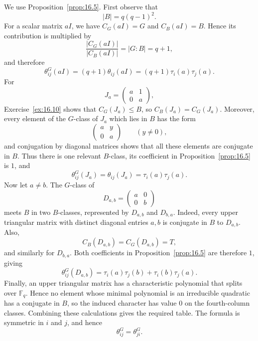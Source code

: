 \documentclass[../Odyssey_Project.tex]{subfiles}
\begin{document}
\begin{solution}
    We use Proposition~\ref{prop:16.5}. First observe that
    \[
        |B|=q(q-1)^2.
    \]
    For a scalar matrix $aI$, we have $C_G(aI)=G$ and $C_B(aI)=B$. Hence its contribution is multiplied by
    \[
        \frac{|C_G(aI)|}{|C_B(aI)|}=|G : B|=q+1,
    \]
    and therefore
    \[
        \theta_{ij}^G(aI)
        =
        (q+1)\theta_{ij}(aI)
        =
        (q+1)\tau_i(a)\tau_j(a).
    \]
    For
    \[
        J_a=
        \begin{pmatrix}
            a&1\\
            0&a
        \end{pmatrix},
    \]
    Exercise~\ref{ex:16.10} shows that $C_G(J_a)\leq B$, so $C_B(J_a)=C_G(J_a)$. Moreover, every element of the $G$-class of $J_a$ which lies in $B$ has the form
    \[
        \begin{pmatrix}
            a&y\\
            0&a
        \end{pmatrix}
        \qquad(y\neq0),
    \]
    and conjugation by diagonal matrices shows that all these elements are conjugate in $B$. Thus there is one relevant $B$-class, its coefficient in Proposition~\ref{prop:16.5} is $1$, and
    \[
        \theta_{ij}^G(J_a)
        =
        \theta_{ij}(J_a)
        =
        \tau_i(a)\tau_j(a).
    \]
    Now let $a\neq b$. The $G$-class of
    \[
        D_{a,b}=
        \begin{pmatrix}
            a&0\\
            0&b
        \end{pmatrix}
    \]
    meets $B$ in two $B$-classes, represented by $D_{a,b}$ and $D_{b,a}$. Indeed, every upper triangular matrix with distinct diagonal entries $a,b$ is conjugate in $B$ to $D_{a,b}$. Also,
    \[
        C_B(D_{a,b})=C_G(D_{a,b})=T,
    \]
    and similarly for $D_{b,a}$. Both coefficients in Proposition~\ref{prop:16.5} are therefore $1$, giving
    \[
        \theta_{ij}^G(D_{a,b})
        =
        \tau_i(a)\tau_j(b)+\tau_i(b)\tau_j(a).
    \]
    Finally, an upper triangular matrix has a characteristic polynomial that splits over $\mathbb{F}_q$. Hence no element whose minimal polynomial is an irreducible quadratic has a conjugate in $B$, so the induced character has value $0$ on the fourth-column classes. Combining these calculations gives the required table. The formula is symmetric in $i$ and $j$, and hence
    \[
        \theta_{ij}^G=\theta_{ji}^G.
    \]
\end{solution}
\end{document}
